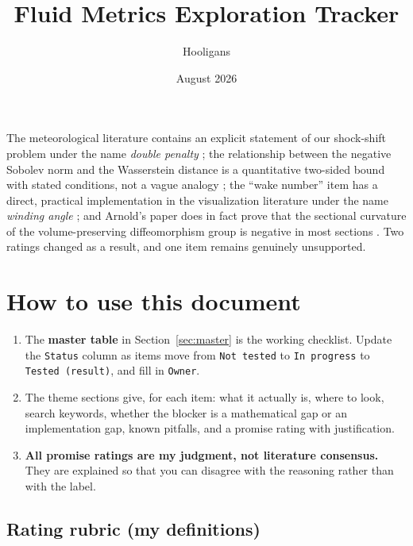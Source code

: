 \documentclass[11pt]{article}
\title{Fluid Metrics Exploration Tracker\\[4pt]
}
\author{Hooligans}
\date{August 2026}
\begin{document}
\maketitle

\medskip
\noindent
The meteorological literature contains an
explicit statement of our shock-shift problem under the name \emph{double penalty}
\cite{wernli2008}; the relationship between the negative Sobolev norm and the Wasserstein
distance is a quantitative two-sided bound with stated conditions, not a vague analogy
\cite{peyre2018}; the ``wake number'' item has a direct, practical implementation in the
visualization literature under the name \emph{winding angle} \cite{sadarjoen2000}; and
Arnold's paper does in fact prove that the sectional curvature of the volume-preserving
diffeomorphism group is negative in most sections \cite{arnold1966}. Two ratings changed as
a result, and one item remains genuinely unsupported.

\tableofcontents

\section{How to use this document}

\begin{enumerate}[leftmargin=*]
\item The \textbf{master table} in Section~\ref{sec:master} is the working checklist.
Update the \texttt{Status} column as items move from \texttt{Not tested} to
\texttt{In progress} to \texttt{Tested (result)}, and fill in \texttt{Owner}.
\item The theme sections give, for each item: what it actually is, where to look, search
keywords, whether the blocker is a mathematical gap or an implementation gap, known
pitfalls, and a promise rating with justification.
\item \textbf{All promise ratings are my judgment, not literature consensus.} They are
explained so that you can disagree with the reasoning rather than with the label.
\end{enumerate}

\subsection{Rating rubric (my definitions)}
\end{document}
